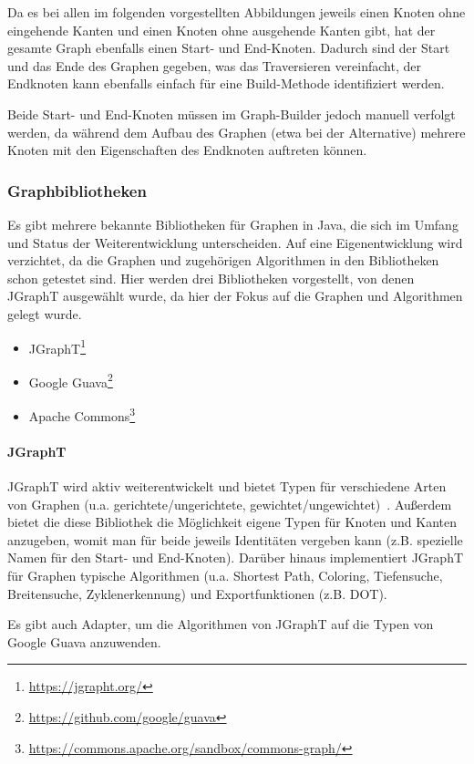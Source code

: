 \documentclass[../InterneDSLs.tex]{subfiles}
\begin{document}
Da es bei allen im folgenden vorgestellten Abbildungen jeweils einen Knoten ohne eingehende Kanten und einen Knoten ohne ausgehende Kanten gibt, hat der gesamte Graph ebenfalls einen Start- und End-Knoten. Dadurch sind der Start und das Ende des Graphen gegeben, was das Traversieren vereinfacht, der Endknoten kann ebenfalls einfach für eine Build-Methode identifiziert werden.

Beide Start- und End-Knoten müssen im Graph-Builder jedoch manuell verfolgt werden, da während dem Aufbau des Graphen (etwa bei der Alternative) mehrere Knoten mit den Eigenschaften des Endknoten auftreten können.

\subsubsection{Graphbibliotheken}
Es gibt mehrere bekannte Bibliotheken für Graphen in Java, die sich im Umfang und Status der Weiterentwicklung unterscheiden. Auf eine Eigenentwicklung wird verzichtet, da die Graphen und zugehörigen Algorithmen in den Bibliotheken schon getestet sind. Hier werden drei Bibliotheken vorgestellt, von denen JGraphT ausgewählt wurde, da hier der Fokus auf die Graphen und Algorithmen gelegt wurde.
\begin{itemize}
	\item JGraphT\footnote{\url{https://jgrapht.org/}}
	\item Google Guava\footnote{\url{https://github.com/google/guava}}
	\item Apache Commons\footnote{\url{https://commons.apache.org/sandbox/commons-graph/}}
\end{itemize}

\paragraph{JGraphT}
JGraphT wird aktiv weiterentwickelt und bietet Typen für verschiedene Arten von Graphen (u.a. gerichtete/ungerichtete, gewichtet/ungewichtet)~\cite{JGraphT}. Außerdem bietet die diese Bibliothek die Möglichkeit eigene Typen für Knoten und Kanten anzugeben, womit man für beide jeweils Identitäten vergeben kann (z.B. spezielle Namen für den Start- und End-Knoten). Darüber hinaus implementiert JGraphT für Graphen typische Algorithmen (u.a. Shortest Path, Coloring, Tiefensuche, Breitensuche, Zyklenerkennung) und Exportfunktionen (z.B. DOT).

Es gibt auch Adapter, um die Algorithmen von JGraphT auf die Typen von Google Guava anzuwenden.
\end{document}
